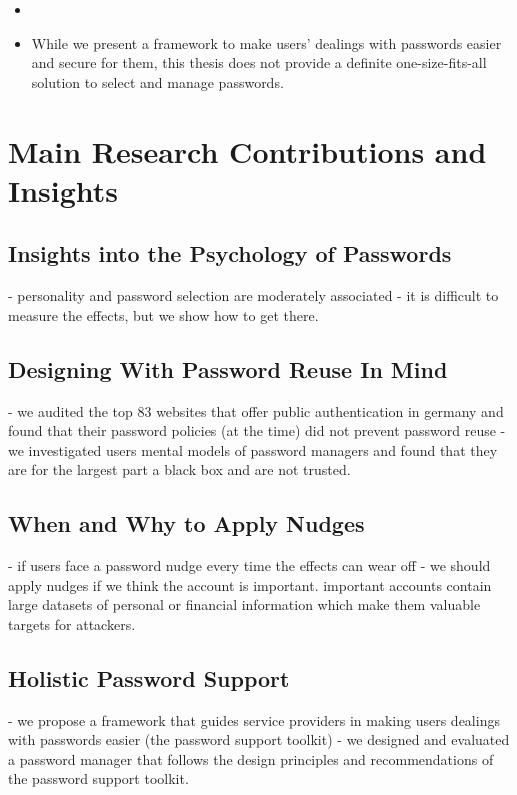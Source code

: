 \begin{itemize}
	\item 
	\item While we present a framework to make users' dealings with passwords easier and secure for them, this thesis does not provide a definite one-size-fits-all solution to select and manage passwords. 
\end{itemize}


\section{Main Research Contributions and Insights}\label{sec:intro:contributions}

\subsection{Insights into the Psychology of Passwords}
- personality and password selection are moderately associated
- it is difficult to measure the effects, but we show how to get there.

\subsection{Designing With Password Reuse In Mind}
- we audited the top 83 websites that offer public authentication in germany and found that their password policies (at the time) did not prevent password reuse
- we investigated users mental models of password managers and found that they are for the largest part a black box and are not trusted.

\subsection{When and Why to Apply Nudges}
- if users face a password nudge every time the effects can wear off 
- we should apply nudges if we think the account is important. important accounts contain large datasets of personal or financial information which make them valuable targets for attackers.

\subsection{Holistic Password Support}
- we propose a framework that guides service providers in making users dealings with passwords easier (the password support toolkit)
- we designed and evaluated a password manager that follows the design principles and recommendations of the password support toolkit. 

